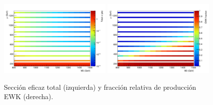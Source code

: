 \clearpage



\begin{figure}[ht!]
  \centering
  \includegraphics[width=0.49\textwidth]{figures/SigXsec_total}
  \includegraphics[width=0.49\textwidth]{figures/SigXsec_ewkFrac}
  \caption{Sección eficaz total (izquierda) y fracción relativa
    de producción EWK (derecha).}
  \label{fig:signal_xs_total}
\end{figure}

